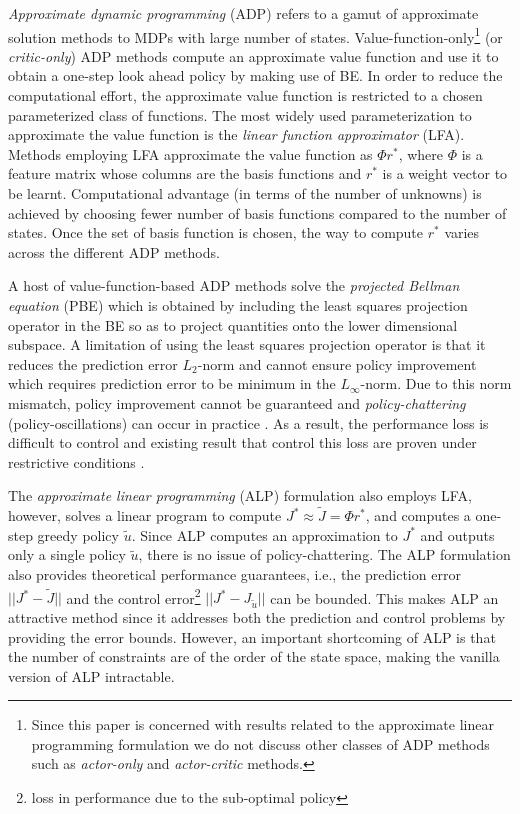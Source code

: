 \emph{Approximate dynamic programming} (ADP) \cite{dpchapter,powell} refers to a gamut of approximate solution methods to MDPs with large number of states. Value-function-only\footnote{Since this paper is concerned with results related to the approximate linear programming formulation we do not discuss other classes of ADP methods such as \emph{actor-only} and \emph{actor-critic} methods.} (or \emph{critic-only}) ADP methods compute an approximate value function and use it to obtain a one-step look ahead policy by making use of BE. In order to reduce the computational effort, the approximate value function is restricted to a chosen parameterized class of functions. The most widely used parameterization to approximate the value function is the \emph{linear function approximator} (LFA). Methods employing LFA approximate the value function as $\Phi r^*$, where $\Phi$ is a feature matrix whose columns are the basis functions and $r^*$ is a weight vector to be learnt. Computational advantage (in terms of the number of unknowns) is achieved by choosing fewer number of basis functions compared to the number of states. Once the set of basis function is chosen, the way to compute $r^*$ varies across the different ADP methods.

A host of value-function-based ADP methods solve the \emph{projected Bellman equation} (PBE) which is obtained by including the least squares projection operator in the BE so as to project quantities onto the lower dimensional subspace. A limitation of using the least squares projection operator is that it reduces the prediction error $L_2$-norm and cannot ensure policy improvement which requires prediction error to be minimum in the $L_\infty$-norm. Due to this norm mismatch, policy improvement cannot be guaranteed and \emph{policy-chattering} (policy-oscillations) can occur in practice \cite{dpchapter}. As a result, the performance loss is difficult to control and existing result that control this loss are proven under restrictive conditions \cite{anszemu:mlj07,FaMuSz10}.

The \emph{approximate linear programming} (ALP) \cite{ALP,CS,SALP,ALP-Bor,gkp,fs,npalp} formulation also employs LFA, however, solves a linear program to compute $J^*\approx\tilde{J}=\Phi r^*$, and computes a one-step greedy policy $\tilde{u}$. Since ALP computes an approximation to $J^*$ and outputs only a single policy $\tilde{u}$, there is no issue of policy-chattering. The ALP formulation also provides theoretical performance guarantees, i.e., the prediction error $||J^*-\tilde{J}||$ and the control error\footnote{loss in performance due to the sub-optimal policy} $||J^*-J_{\tilde{u}}||$ can be bounded. This makes ALP an attractive method since it addresses both the prediction and control problems by providing the error bounds. However, an important shortcoming of ALP is that the number of constraints are of the order of the state space, making the vanilla version of ALP intractable.

